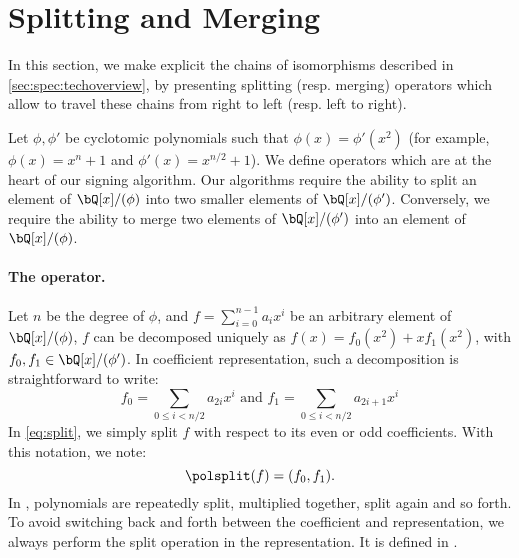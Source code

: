 \section{Splitting and Merging} \label{sec:spec:splitmerge}

In this section, we make explicit the chains of isomorphisms described in \cref{sec:spec:techoverview}, by presenting splitting (resp. merging) operators which allow to travel these chains from right to left (resp. left to right).

Let $\phi, \phi'$ be cyclotomic polynomials such that $\phi(x) = \phi'(x^2)$ (for example, $\phi(x) = x^n + 1$ and $\phi'(x) = x^{n/2} + 1$). We define operators which are at the heart of our signing algorithm. Our algorithms require the ability to split an element of $\bQ[x]/(\phi)$ into two smaller elements of $\bQ[x]/(\phi')$. Conversely, we require the ability to merge two elements of $\bQ[x]/(\phi')$ into an element of $\bQ[x]/(\phi)$.


\paragraph{The \splitfft operator.} Let $n$ be the degree of $\phi$, and $f = \sum_{i=0}^{n-1} a_i x^i$ be an arbitrary element of $\bQ[x]/(\phi)$, $f$ can be decomposed uniquely as $f(x) = f_0(x^2) + xf_1(x^2)$, with $f_0, f_1 \in \bQ[x]/(\phi')$. In coefficient representation, such a decomposition is straightforward to write:
\begin{equation}\label{eq:split}
f_0 = \sum\limits_{0 \leq i < n/2} a_{2i} x^i \text{\ \ \ and\ \ \ }f_1 = \sum\limits_{0 \leq i < n/2} a_{2i+1} x^i
\end{equation}
In \eqref{eq:split}, we simply split $f$ with respect to its even or odd coefficients. With this notation, we note:
\begin{equation}\label{eq:splitdef}
\polsplit(f) = (f_0,f_1).
\end{equation}
In \falcon, polynomials are repeatedly split, multiplied together, split again and so forth. To avoid switching back and forth between the coefficient and \fft representation, we always perform the split operation in the \fft representation. It is defined in \longsplitfft.


\begin{algorithm}%
\caption{$\splitfft(\fft(f))$}\label{alg:splitfft}
 \begin{algorithmic}[1]
 \EndFor
 \end{algorithmic}
\end{algorithm}

